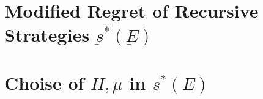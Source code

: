 \documentclass[11pt]{article}
\numberwithin{equation}{section}
\theoremstyle{boldStyle}
\begin{document}
\newpage
\section{Modified Regret of Recursive Strategies $\underbar{s}^*(\underbar{E})$}





\newpage
\section{Choise of $\underbar{H}, \mu$ in $\underbar{s}^*(\underbar{E})$}
\end{document}
